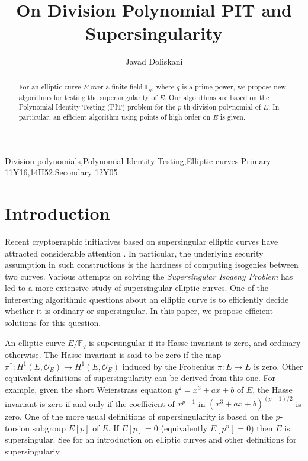 \documentclass[review]{elsarticle}
\date{}
\theoremstyle{plain}
\theoremstyle{definition}
\def\F{\ensuremath{\mathbb{F}}}
\begin{document}
\begin{frontmatter}
	
\title{On Division Polynomial PIT and Supersingularity}

\author{Javad Doliskani}
\address{Institute for Quantum Computing, University of Waterloo}

\begin{abstract}
	For an elliptic curve $E$ over a finite field $\F_q$, where $q$ is a prime power, we 
	propose new algorithms for testing the supersingularity of $E$. Our algorithms are based on the 
	Polynomial Identity Testing (PIT) problem for the $p$-th division polynomial of $E$. In 
	particular, an efficient algorithm using points of high order on $E$ is given.
\end{abstract}
	
\begin{keyword}
	Division polynomials\sep Polynomial Identity Testing\sep Elliptic curves 
	\MSC[2010] Primary 11Y16\sep 14H52\sep Secondary 12Y05
\end{keyword}
	
\end{frontmatter}




\section{Introduction}
\label{sec:intro}

Recent cryptographic initiatives based on supersingular elliptic curves have attracted considerable 
attention \cite{Jao2011, Jao2014, Charles2009}. In particular, the underlying security assumption 
in such constructions is the hardness of computing isogenies between two curves. Various attempts 
on solving the \textit{Supersingular Isogeny Problem} has led to a more extensive study of 
supersingular elliptic curves. One of the interesting algorithmic questions about an elliptic curve 
is to efficiently decide whether it is ordinary or supersingular. In this paper, we propose 
efficient solutions for this question.

An elliptic curve $E / \F_q$ is supersingular if its Hasse invariant is zero, and ordinary 
otherwise. The Hasse invariant is said to be zero if the map $\pi^*: H^1(E, \mathscr{O}_E) 
\rightarrow H^1(E, \mathscr{O}_E)$ induced by the Frobenius $\pi: E \rightarrow E$ is zero. Other 
equivalent definitions of supersingularity can be derived from this one. For example, given the 
short Weierstrass equation $y^2 = x^3 + ax + b$ of $E$, the Hasse invariant is zero if and only if 
the coefficient of $x^{p - 1}$ in $(x^3 + ax + b)^{(p - 1) / 2}$ is zero. One of the more usual 
definitions of supersingularity is based on the $p$-torsion subgroup $E[p]$ of $E$. If $E[p] = 0$ 
(equivalently $E[p^n] = 0$) then $E$ is supersingular. See \cite{Husemoeller1987} for an 
introduction on elliptic curves and other definitions for supersingulariy. 
\end{document}
